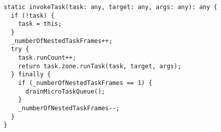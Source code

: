 \begin{verbatim}
  static invokeTask(task: any, target: any, args: any): any {
    if (!task) {
      task = this;
    }
    _numberOfNestedTaskFrames++;
    try {
      task.runCount++;
      return task.zone.runTask(task, target, args);
    } finally {
      if (_numberOfNestedTaskFrames == 1) {
        drainMicroTaskQueue();
      }
      _numberOfNestedTaskFrames--;
    }
  }
\end{verbatim}
